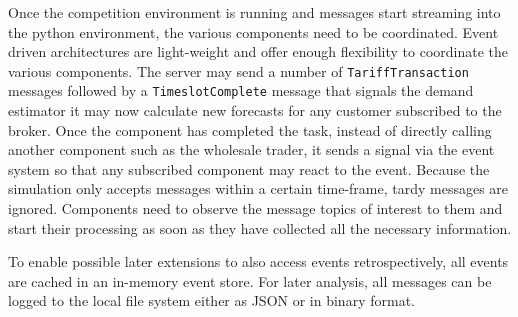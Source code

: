 Once the competition environment is running and messages start streaming into the python environment, the various
components need to be coordinated. Event driven architectures are light-weight and offer
enough flexibility to coordinate the various components. The server may send a number of \texttt{TariffTransaction}
messages followed by a \texttt{TimeslotComplete} message that signals the demand estimator it may now calculate new
forecasts for any customer subscribed to the broker. Once the component has completed the task, instead of directly
calling another component such as the wholesale trader, it sends a signal via the event system so that any subscribed
component may react to the event. Because the simulation only accepts messages within a certain time-frame, tardy
messages are ignored. Components need to observe the message topics of interest to them and start their processing as
soon as they have collected all the necessary information.

To enable possible later extensions to also access events retrospectively, all events are cached in an in-memory event
store. For later analysis, all messages can be logged to the local file system either as \ac{JSON} or in binary format.

%
%
%

